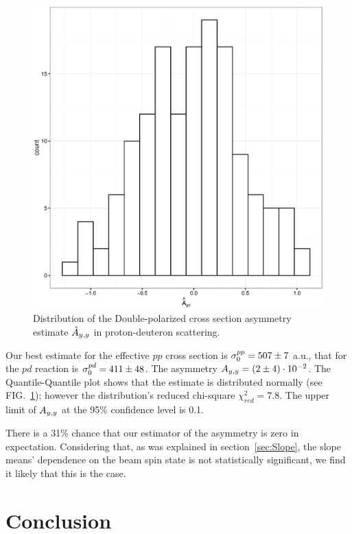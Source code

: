 \documentclass[reprint, superscriptaddress]{revtex4-1}
\newcommand{\vp}[2]{#1\cdot10^{#2}}
\begin{document}
\begin{figure}[h]
	\centering
	\includegraphics[scale=.35]{img/Ayy_dens.eps}
	\caption{Distribution of the Double-polarized cross section asymmetry estimate $\Ayy*$ in proton-deuteron scattering.\label{fig:AyyDensity}}
\end{figure}

Our best estimate for the effective $pp$ cross section is $\CS[0]^{pp} = 507 \pm 7$ a.u., that for the $pd$ reaction is $\CS[0]^{pd} = 411 \pm 48$. The asymmetry $\Ayy = \vp{(2 \pm 4)}{-2}$. The Quantile-Quantile plot shows that the estimate is distributed normally (see FIG.~\ref{fig:AyyDensity}); however the distribution's reduced chi-square $\chi^2_{red} = 7.8$. The upper limit of $\Ayy$ at the 95\% confidence level is 0.1.

There is a 31\% chance that our estimator of the asymmetry is zero in expectation. Considering that, as was explained in section~\ref{sec:Slope}, the slope means' dependence on the beam spin state is not statistically significant, we find it likely that this is the case. 

\section{Conclusion}
\end{document}

